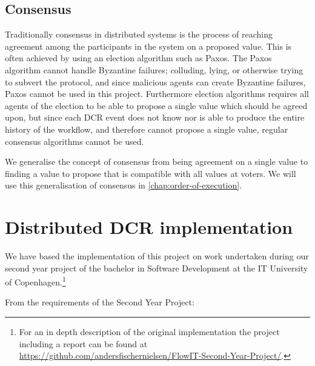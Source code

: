 		
		\subsection{Consensus}
		Traditionally consensus in distributed systems is the process of reaching agreement among the participants in the system on a proposed value. This is often achieved by using an election algorithm such as Paxos\cite{Lamport:1998:PP:279227.279229}. The Paxos algorithm cannot handle Byzantine failures; colluding, lying, or otherwise trying to subvert the protocol, and since malicious agents can create Byzantine failures, Paxos cannot be used in this project. Furthermore election algorithms requires all agents of the election to be able to propose a single value which should be agreed upon, but since each DCR event does not know nor is able to produce the entire history of the workflow, and therefore cannot propose a single value, regular consensus algorithms cannot be used. 
        
        \newpar We generalise the concept of consensus from being agreement on a single value to finding a value to propose that is compatible with all values at voters. We will use this generalisation of consensus in \autoref{chap:order-of-execution}.
		
	\section{Distributed DCR implementation}
		We have based the implementation of this project on work undertaken during our second year project of the bachelor in Software Development at the IT University of Copenhagen.\footnote{For an in depth description of the original implementation the project including a report can be found at \url{https://github.com/andersfischernielsen/FlowIT-Second-Year-Project/}.}
		
		\newpar From the requirements of the Second Year Project:
		

